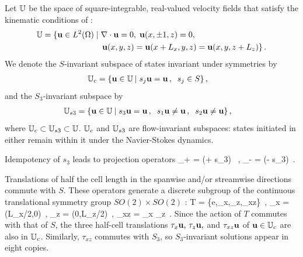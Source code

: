 \documentclass[letter,10pt,openany]{article}
\begin{document}
Let $\mathbb{U}$ be the space of square-integrable, real-valued velocity
fields that satisfy the kinematic conditions of \pCf:
\begin{align}
 \bbU  &= \{\bu \in L^2(\bCell) \; | \; \grad \cdot \bu = 0,
               \; \bu(x, \pm 1, z) = 0, \notag \\
         &\phantom{=} {} \qquad \qquad \qquad \; \; %
          \bu(x, y, z) = \bu(x+L_x, y, z) = \bu(x, y, z + L_z)\}
\,.
\end{align}
We denote the $S$-invariant subspace of states invariant under
symmetries  by
\begin{align}
\mathbb{U}_{c}  &= \{{\bf u} \in \mathbb{U}  \: | \;
              s_j {\bf u} = {\bf u}\,, \;\;  s_j \in S \}
\,,
\label{symmSubspU}
\end{align}
and the $S_3$-invariant subspace by
\begin{align}
\bbUthree  &= \{\bu \in \bbU  \: | \;
              s_3 \bu = \bu\,, \;\; %
              s_1 \bu \neq \bu\,, \;\;  s_2 \bu \neq \bu
               \}
\,,
\label{symmUthree}
\end{align}
where $ \mathbb{U}_{c} \subset \mathbb{U}_{s3} \subset \mathbb{U}$.
%
$\mathbb{U}_{c}$ and  $\mathbb{U}_{s3}$ are flow-invariant subspaces: states initiated
in either remain within it under the Navier-Stokes dynamics.

Idempotency of $s_3$ leads to projection operators
\beq
{\PP}_+ =
    (\matId + s_3) \, ,\qquad
{\PP}_- =
    (\matId - s_3) \,.

Translations of half the cell length in the spanwise and/or streamwise
directions commute with $S$. These operators generate a discrete
subgroup of the continuous translational symmetry group $SO(2) \times
SO(2)$ :
\beq
T = \{e,\tau_x,\tau_z,\tau_{xz}\}
    \,,\qquad
    \tau_x = \tau(L_x/2,0)
    \,,\;
    \tau_z = \tau(0,L_z/2)
    \,,\;
    \tau_{xz} = \tau_x \tau_z
\,.
Since the action of $T$ commutes with that of $S$,
the three half-cell translations $\tau_x {\bf u}, \, \tau_z {\bf u},$ and
$\tau_{xz} {\bf u}$ of ${\bf u} \in \mathbb{U}_{c}$ are also in $\mathbb{U}_{c}$.
Similarly, $\tau_{xz}$ commutes with $S_3$, so $S_3$-invariant
solutions appear in eight copies.
\end{document}
